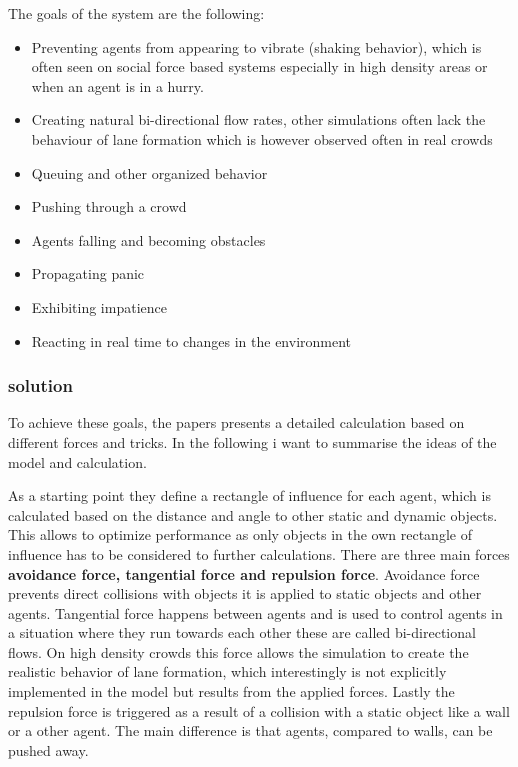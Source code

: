 \documentclass{acmsiggraph}               %
\begin{document}
The goals of the system are the following:
\begin{itemize}
    \item Preventing agents from appearing to vibrate (shaking behavior), which is often seen on social force based systems especially in high density areas or when an agent is in a hurry.
    \item Creating natural bi-directional flow rates, other simulations often lack the behaviour of lane formation which is however observed often in real crowds
    \item Queuing and other organized behavior
    \item Pushing through a crowd
    \item Agents falling and becoming obstacles 
    \item Propagating panic
    \item Exhibiting impatience
    \item Reacting in real time to changes in the environment
\end{itemize}

\subsubsection{solution}
To achieve these goals, the papers presents a detailed calculation based on different forces and tricks. In the following i want to summarise the ideas of the model and calculation. 

As a starting point they define a rectangle of influence for each agent, which is calculated based on the distance and angle to other static and dynamic objects. This allows to optimize performance as only objects in the own rectangle of influence has to be considered to further calculations. 
There are three main forces \textbf{avoidance force, tangential force and repulsion force}. Avoidance force prevents direct collisions with objects it is applied to static objects and other agents. Tangential force happens between agents and is used to control agents in a situation where they run towards each other these are called bi-directional flows. On high density crowds this force allows the simulation to create the realistic behavior of lane formation, which interestingly is not explicitly implemented in the model but results from the applied forces. Lastly the repulsion force is triggered as a result of a collision with a static object like a wall or a other agent. The main difference is that agents, compared to walls, can be pushed away. 
\end{document}
